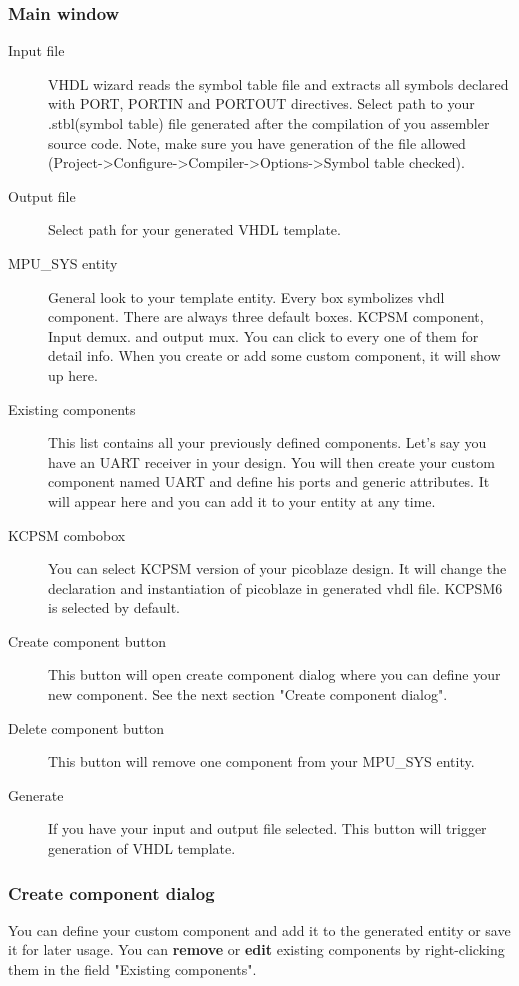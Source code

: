 \subsubsection{Main window}
    \begin{description}
        \item [Input file]
            VHDL wizard reads the symbol table file and extracts all symbols declared with PORT, PORTIN and PORTOUT directives. Select path to your .stbl(symbol table) file generated after the compilation of you assembler source code. Note, make sure you
            have generation of the file allowed (Project->Configure->Compiler->Options->Symbol table checked).
        \item [Output file]
            Select path for your generated VHDL template.
        \item [MPU\_SYS entity]
            General look to your template entity. Every box symbolizes vhdl component. There are always three default boxes. KCPSM component, Input demux.
            and output mux. You can click to every one of them for detail info. When you create or add some custom component, it will show
            up here. 
        \item [Existing components]
            This list contains all your previously defined components. Let's say you have an UART receiver in your design. You will then create your custom component named UART
            and define his ports and generic attributes. It will appear here and you can add it to your entity at any time. 
        \item [KCPSM combobox]
            You can select KCPSM version of your picoblaze design. It will change the declaration and instantiation of picoblaze in generated vhdl file. KCPSM6 is selected
            by default.
        \item [Create component button]
            This button will open create component dialog where you can define your new component. See the next section "Create component dialog".
        \item [Delete component button]
            This button will remove one component from your MPU\_SYS entity. 
        \item [Generate]
            If you have your input and output file selected. This button will trigger generation of VHDL template.
    \end{description}

\subsubsection{Create component dialog}
    You can define your custom component and add it to the generated entity or save it for later usage. You can \textbf{remove} or \textbf{edit} existing components by
    right-clicking them in the field "Existing components".
    
